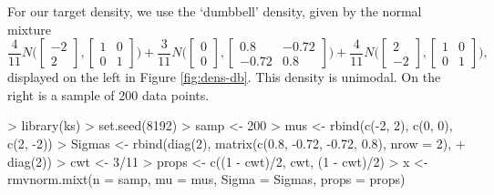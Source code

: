 \documentclass[a4paper,11pt]{article}
\begin{document}
For our target density, we use the 
 `dumbbell' density, given by the normal mixture
$$ \frac{4}{11} N \bigg( \begin{bmatrix}-2 \\ 2\end{bmatrix}, 
\begin{bmatrix}1 & 0 \\ 0 & 1 \end{bmatrix} \bigg)+ 
\frac{3}{11} N \bigg( \begin{bmatrix}0 \\ 0\end{bmatrix},
\begin{bmatrix}0.8 & -0.72 \\ -0.72 & 0.8\end{bmatrix} \bigg)+
\frac{4}{11} N \bigg( \begin{bmatrix}2 \\ -2\end{bmatrix}, 
\begin{bmatrix}1 & 0 \\ 0 & 1 \end{bmatrix} \bigg),
$$
displayed on the left in Figure \ref{fig:dens-db}. This 
density is unimodal. On the right is a
sample of 200 data points.
 
\begin{Schunk}
\begin{Sinput}
> library(ks)
> set.seed(8192)
> samp <- 200
> mus <- rbind(c(-2, 2), c(0, 0), c(2, -2))
> Sigmas <- rbind(diag(2), matrix(c(0.8, -0.72, -0.72, 0.8), nrow = 2), 
+     diag(2))
> cwt <- 3/11
> props <- c((1 - cwt)/2, cwt, (1 - cwt)/2)
> x <- rmvnorm.mixt(n = samp, mu = mus, Sigma = Sigmas, props = props)
\end{Sinput}
\end{Schunk}
\end{document}
